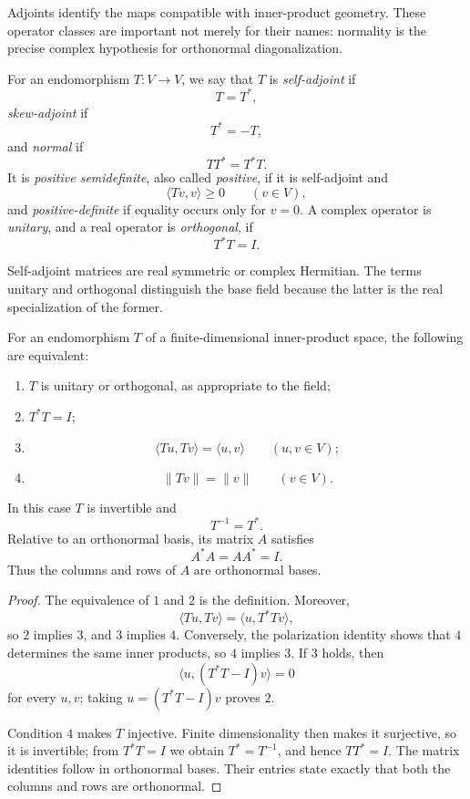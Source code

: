 Adjoints identify the maps compatible with inner-product geometry. These
operator classes are important not merely for their names: normality is the
precise complex hypothesis for orthonormal diagonalization.

\begin{definition}
For an endomorphism \(T:V\to V\), we say that \(T\) is \emph{self-adjoint}
if
\[
T=T^*,
\]
\emph{skew-adjoint} if
\[
T^*=-T,
\]
and \emph{normal} if
\[
TT^*=T^*T.
\]
It is \emph{positive semidefinite}, also called \emph{positive}, if it is
self-adjoint and
\[
\langle Tv,v\rangle\geq0
\qquad(v\in V),
\]
and \emph{positive-definite} if equality occurs only for \(v=0\). A complex
operator is \emph{unitary}, and a real operator is \emph{orthogonal}, if
\[
T^*T=I.
\]
\end{definition}

Self-adjoint matrices are real symmetric or complex Hermitian. The terms
unitary and orthogonal distinguish the base field because the latter is the
real specialization of the former.

\begin{proposition}
For an endomorphism \(T\) of a finite-dimensional inner-product space, the
following are equivalent:
\begin{enumerate}
\item \(T\) is unitary or orthogonal, as appropriate to the field;
\item \(T^*T=I\);
\item
\[
\langle Tu,Tv\rangle=\langle u,v\rangle
\qquad(u,v\in V);
\]
\item
\[
\lVert Tv\rVert=\lVert v\rVert
\qquad(v\in V).
\]
\end{enumerate}
In this case \(T\) is invertible and
\[
T^{-1}=T^*.
\]
Relative to an orthonormal basis, its matrix \(A\) satisfies
\[
A^*A=AA^*=I.
\]
Thus the columns and rows of \(A\) are orthonormal bases.
\end{proposition}
\begin{proof}
The equivalence of \(1\) and \(2\) is the definition. Moreover,
\[
\langle Tu,Tv\rangle=\langle u,T^*Tv\rangle,
\]
so \(2\) implies \(3\), and \(3\) implies \(4\). Conversely, the polarization
identity shows that \(4\) determines the same inner products, so \(4\) implies
\(3\). If \(3\) holds, then
\[
\langle u,(T^*T-I)v\rangle=0
\]
for every \(u,v\); taking \(u=(T^*T-I)v\) proves \(2\).

Condition \(4\) makes \(T\) injective. Finite dimensionality then makes it
surjective, so it is invertible; from \(T^*T=I\) we obtain \(T^*=T^{-1}\),
and hence \(TT^*=I\). The matrix identities follow in orthonormal bases.
Their entries state exactly that both the columns and rows are orthonormal.
\end{proof}

